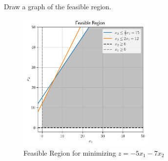 Draw a graph of the feasible region.

\begin{solution}
  \begin{figure}[h]
    \centering
    \includegraphics[width=0.6\textwidth]{problem_5i.png}
    \caption{Feasible Region for minimizing $z = -5x_1 - 7x_2$}
    \label{fig:problem_5i}
  \end{figure}
  \ \\
\end{solution}
